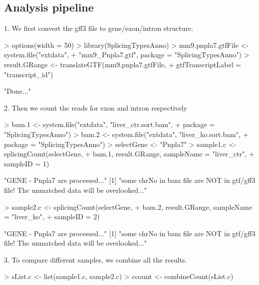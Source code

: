 \documentclass[a4paper]{article}
\begin{document}
\subsection{Analysis pipeline}
1. We first convert the gff3 file to gene/exon/intron structure.
\begin{Schunk}
\begin{Sinput}
> options(width = 50)
> library(SplicingTypesAnno)
> mm9.pnpla7.gtfFile <- system.file("extdata", 
+     "mm9_Pnpla7.gtf", package = "SplicingTypesAnno")
> result.GRange <- translateGTF(mm9.pnpla7.gtfFile, 
+     gtfTranscriptLabel = "transcript_id")
\end{Sinput}
\begin{Soutput}
[1] "Done..."
\end{Soutput}
\end{Schunk}
2. Then we count the reads for exon and intron respectively
\begin{Schunk}
\begin{Sinput}
> bam.1 <- system.file("extdata", "liver_ctr.sort.bam", 
+     package = "SplicingTypesAnno")
> bam.2 <- system.file("extdata", "liver_ko.sort.bam", 
+     package = "SplicingTypesAnno")
> selectGene <- "Pnpla7"
> sample1.c <- splicingCount(selectGene, 
+     bam.1, result.GRange, sampleName = "liver_ctr", 
+     sampleID = 1)
\end{Sinput}
\begin{Soutput}
[1] "GENE - Pnpla7 are processed..."
[1] "some chrNo in bam file are NOT in gtf/gff3 file! The unmatched data will be overlooked..."
\end{Soutput}
\begin{Sinput}
> sample2.c <- splicingCount(selectGene, 
+     bam.2, result.GRange, sampleName = "liver_ko", 
+     sampleID = 2)
\end{Sinput}
\begin{Soutput}
[1] "GENE - Pnpla7 are processed..."
[1] "some chrNo in bam file are NOT in gtf/gff3 file! The unmatched data will be overlooked..."
\end{Soutput}
\end{Schunk}
3. To compare different samples, we combine all the results.
\begin{Schunk}
\begin{Sinput}
> sList.c <- list(sample1.c, sample2.c)
> ccount <- combineCount(sList.c)
\end{Sinput}
\end{Schunk}
\end{document}
